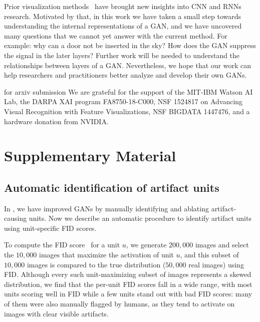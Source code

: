 \documentclass{article} %
\def\arxiv{for arxiv submission}
\begin{document}
Prior visualization methods~\citep{zeiler2014visualizing,bau2017network,karpathy2016visualizing} have brought new insights into CNN and RNNs research. Motivated by that, in this work we have taken a small step towards understanding the internal representations of a GAN, and we have uncovered many questions that we cannot yet answer with the current method. For example: why can a door not be inserted in the sky? How does the GAN suppress the signal in the later layers?  Further work will be needed to understand the relationships between layers of a GAN. Nevertheless, we hope that our work can help researchers and practitioners better analyze and develop their own GANs.

\ifdefined\arxiv%
We are grateful for the support of the MIT-IBM Watson AI Lab, the DARPA XAI program FA8750-18-C000, NSF 1524817 on Advancing Visual Recognition with Feature Visualizations, NSF BIGDATA 1447476, and a hardware donation from NVIDIA.
\else\author{}\fi

\clearpage




\clearpage\renewcommand{\thesection}{S-\arabic{section}}\section{Supplementary Material}\subsection{Automatic identification of artifact units}

In , we have improved GANs by manually identifying and ablating artifact-causing units. Now we describe an automatic procedure to identify artifact units using unit-specific FID scores.

To compute the FID score~\citep{heusel2017gans} for a unit $u$, we generate $200,000$ images and select the $10,000$ images that maximize the activation of unit $u$, and this subset of $10,000$ images is compared to the true distribution ($50, 000$ real images) using FID.  Although every such unit-maximizing subset of images represents a skewed distribution, we find that the per-unit FID scores fall in a wide range, with most units scoring well in FID while a few units stand out with bad FID scores: many of them were also manually flagged by humans, as they tend to activate on images with clear visible artifacts.
\end{document}
